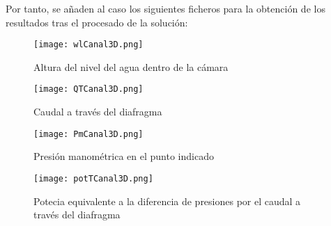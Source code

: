 Por tanto, se añaden al caso los siguientes ficheros para la obtención
de los resultados tras el procesado de la solución:


\begin{figure}
\centering
\texttt{[image: wlCanal3D.png]}
\caption{Altura del nivel del agua dentro de la cámara}
\label{fig:wlCanal3D}
\end{figure}

\begin{figure}
\centering
\texttt{[image: QTCanal3D.png]}
\caption{Caudal a través del diafragma}
\label{fig:QTCanal3D}
\end{figure}
  
\begin{figure}
\centering
\texttt{[image: PmCanal3D.png]}
\caption{Presión manométrica en el punto indicado}
\label{fig:PmCanal3D}
\end{figure}
  
\begin{figure}
\centering
\texttt{[image: potTCanal3D.png]}
\caption[Potencia máxima]{Potecia equivalente a la diferencia de presiones por el caudal a través del diafragma}
\label{fig:potTCanal3D}
\end{figure}

